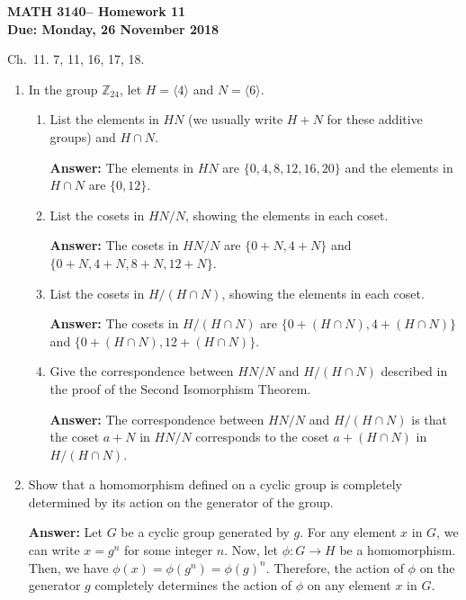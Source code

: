 \documentclass[12pt,reqno]{amsart}
\newcommand{\<}{\ensuremath{\langle}}
\renewcommand{\>}{\ensuremath{\rangle}}
\newcommand{\subject}{MATH\xspace}
\newcommand{\coursenumber}{3140\xspace}
\newcommand{\exercises}{Ch.~11. 7, 11, 16, 17, 18.}
\newcommand{\due}[1]{{\bf Due:} #1}
\newcommand{\hwheading}{\textbf{\subject \coursenumber -- Homework 11 \\ \due{Monday, 26 November 2018}}}
\begin{document}
\thispagestyle{empty}

\noindent \hwheading

 \exercises 

\bigskip

\begin{enumerate}
\item[{\bf 11.7}] 
In the group ${\mathbb Z}_{24}$, let $H = \langle 4 \rangle$ and $N =
\langle 6 \rangle$. 
\begin{enumerate}
 
 \item
List the elements in $HN$ (we usually write $H + N$ for these additive
groups) and $H \cap N$. 

\textbf{Answer:} The elements in $HN$ are $\{0, 4, 8, 12, 16, 20\}$ and the elements in $H \cap N$ are $\{0, 12\}$.
 
 \item
List the cosets in $HN/N$, showing the elements in each coset.

\textbf{Answer:} The cosets in $HN/N$ are $\{0 + N, 4 + N\}$ and $\{0 + N, 4 + N, 8 + N, 12 + N\}$.

 
 \item
List the cosets in $H/(H \cap N)$, showing the elements in each coset. 

\textbf{Answer:} The cosets in $H/(H \cap N)$ are $\{0 + (H \cap N), 4 + (H \cap N)\}$ and $\{0 + (H \cap N), 12 + (H \cap N)\}$.

 
 \item
Give the correspondence between $HN/N$ and $H/(H \cap N)$ described in
the proof of the Second Isomorphism Theorem. 

\textbf{Answer:} The correspondence between $HN/N$ and $H/(H \cap N)$ is that the coset $a + N$ in $HN/N$ corresponds to the coset $a + (H \cap N)$ in $H/(H \cap N)$.
\end{enumerate}


\bigskip

\item[{\bf 11.11}]
Show that a homomorphism defined on a cyclic group is completely
determined by its action on the generator of the group.

\textbf{Answer:} Let $G$ be a cyclic group generated by $g$. For any element $x$ in $G$, we can write $x = g^n$ for some integer $n$. Now, let $\phi: G \rightarrow H$ be a homomorphism. Then, we have $\phi(x) = \phi(g^n) = \phi(g)^n$. Therefore, the action of $\phi$ on the generator $g$ completely determines the action of $\phi$ on any element $x$ in $G$.


\end{enumerate}
\end{document}

